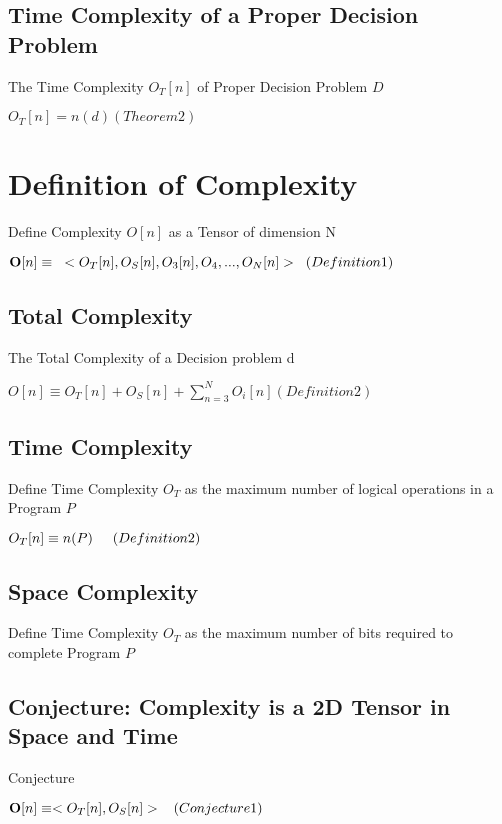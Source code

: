 \documentclass[11pt]{article}
\begin{document}
\subsection{Time Complexity of a Proper Decision Problem}
The Time Complexity $O_T [n]$ of Proper Decision Problem $D$
\begin{center}
$
O_T[n] = n(d) (Theorem 2)
$
\end{center}





\section{Definition of Complexity}
Define Complexity $O[n]$ as a Tensor of dimension N
\begin{center}
$
\bold{O}[n] \equiv \hspace{3mm} < O_T [n], O_S [n],O_3[n],O_4,...,O_N[n]> \hspace{2mm} (Definition 1)
$
\end{center}

\subsection{Total Complexity}
The Total Complexity of a Decision problem d
\begin{center}
$
O[n] \equiv O_T[n] + O_S[n] + \sum_{n=3}^N{O_i[n]} (Definition 2)
$
\end{center}


\subsection{Time Complexity}
Define Time Complexity $O_T$ as the maximum number of logical operations in a Program $P$
\begin{center}
$
O_T[n] \equiv n(P) \hspace{5mm} (Definition 2)
$
\end{center}

\subsection{Space Complexity}
Define Time Complexity $O_T$ as the maximum number of bits required to complete Program $P$

\subsection{Conjecture: Complexity is a 2D Tensor in Space and Time}
Conjecture
\begin{center}
$
\bold{O}[n] \equiv <O_T[n],O_S[n]> \hspace{3mm} (Conjecture 1)
$
\end{center}
\end{document}
